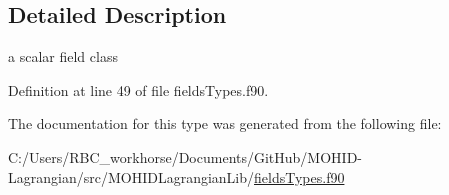 \subsection{Detailed Description}
a scalar field class 

Definition at line 49 of file fields\+Types.\+f90.



The documentation for this type was generated from the following file\+:\begin{DoxyCompactItemize}
\item 
C\+:/\+Users/\+R\+B\+C\+\_\+workhorse/\+Documents/\+Git\+Hub/\+M\+O\+H\+I\+D-\/\+Lagrangian/src/\+M\+O\+H\+I\+D\+Lagrangian\+Lib/\mbox{\hyperlink{fields_types_8f90}{fields\+Types.\+f90}}\end{DoxyCompactItemize}
